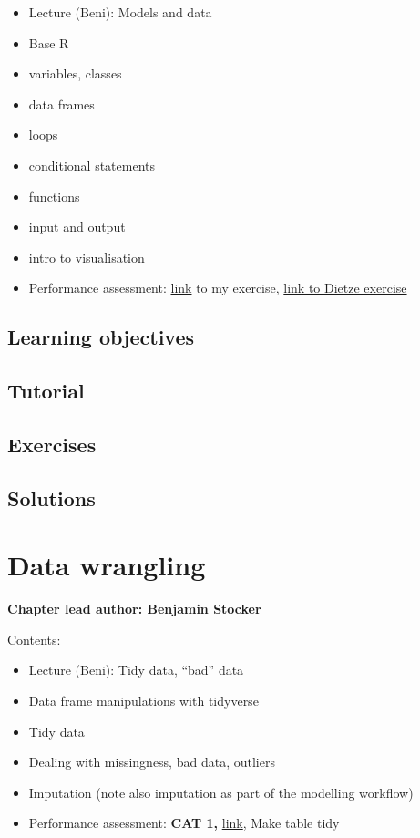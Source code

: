 \documentclass[
]{book}
\providecommand{\tightlist}{%
  \setlength{\itemsep}{0pt}\setlength{\parskip}{0pt}}
\begin{document}
\begin{itemize}
\tightlist
\item
  Lecture (Beni): Models and data
\item
  Base R
\item
  variables, classes
\item
  data frames
\item
  loops
\item
  conditional statements
\item
  functions
\item
  input and output
\item
  intro to visualisation
\item
  Performance assessment: \href{https://stineb.netlify.app/files/ex1.pdf}{link} to my exercise, \href{https://github.com/stineb/EF_Activities/blob/master/Exercise_01_RPrimer.Rmd}{link to Dietze exercise}
\end{itemize}

\hypertarget{learning-objectives-1}{%
\section{Learning objectives}\label{learning-objectives-1}}

\hypertarget{tutorial-1}{%
\section{Tutorial}\label{tutorial-1}}

\hypertarget{exercises-1}{%
\section{Exercises}\label{exercises-1}}

\hypertarget{solutions-1}{%
\section{Solutions}\label{solutions-1}}

\hypertarget{data_wrangling}{%
\chapter{Data wrangling}\label{data_wrangling}}

\textbf{Chapter lead author: Benjamin Stocker}

Contents:

\begin{itemize}
\tightlist
\item
  Lecture (Beni): Tidy data, ``bad'' data
\item
  Data frame manipulations with tidyverse
\item
  Tidy data
\item
  Dealing with missingness, bad data, outliers
\item
  Imputation (note also imputation as part of the modelling workflow)
\item
  Performance assessment: \textbf{CAT 1,} \href{https://stineb.github.io/esds_book/ch-02.html\#exercise-1}{link}, Make table tidy
\end{itemize}
\end{document}
